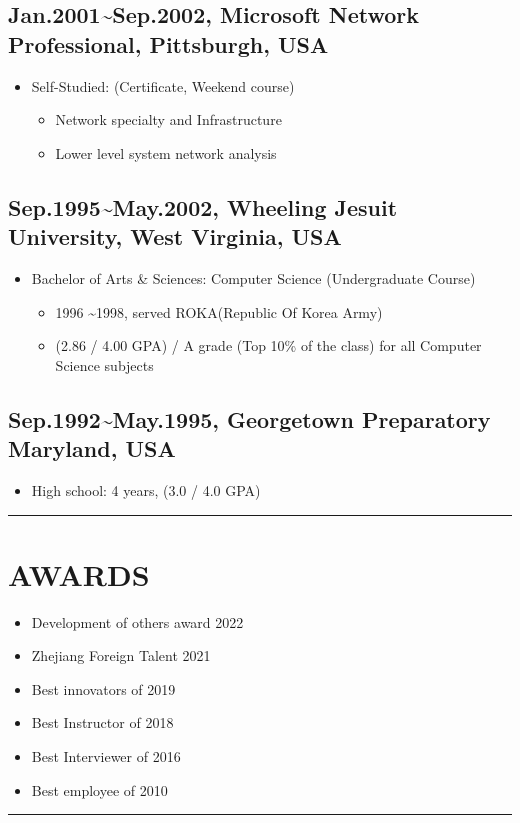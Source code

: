 \documentclass[12pt,a4paper]{article}
\begin{document}
\subsection{Jan.2001{\textasciitilde}Sep.2002, Microsoft Network Professional, Pittsburgh, USA}
\begin{itemize}
\item Self-Studied: (Certificate, Weekend course)

\begin{itemize}
\item Network specialty and Infrastructure


\item Lower level system network analysis

\end{itemize}
\end{itemize}
\subsection{Sep.1995{\textasciitilde}May.2002, Wheeling Jesuit University, West Virginia, USA}
\begin{itemize}
\item Bachelor of Arts \& Sciences: Computer Science (Undergraduate Course)

\begin{itemize}
\item 1996 {\textasciitilde}1998, served ROKA(Republic Of Korea Army) 


\item (2.86 / 4.00 GPA) / A grade (Top 10\% of the class) for all Computer Science subjects

\end{itemize}
\end{itemize}
\subsection{Sep.1992{\textasciitilde}May.1995, Georgetown Preparatory Maryland, USA}
\begin{itemize}
\item High school: 4 years, (3.0 / 4.0 GPA)

\end{itemize}
\rule{\textwidth}{1pt}
\section{AWARDS}
\begin{itemize}
\item Development of others award 2022


\item Zhejiang Foreign Talent 2021


\item Best innovators of 2019


\item Best Instructor of 2018


\item Best Interviewer of 2016


\item Best employee of 2010

\end{itemize}
\rule{\textwidth}{1pt}
\end{document}
